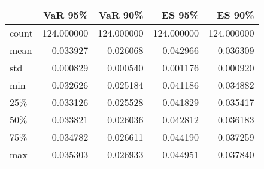 \begin{tabular}{lrrrr}
\toprule
{} &     VaR 95\% &     VaR 90\% &      ES 95\% &      ES 90\% \\
\midrule
count &  124.000000 &  124.000000 &  124.000000 &  124.000000 \\
mean  &    0.033927 &    0.026068 &    0.042966 &    0.036309 \\
std   &    0.000829 &    0.000540 &    0.001176 &    0.000920 \\
min   &    0.032626 &    0.025184 &    0.041186 &    0.034882 \\
25\%   &    0.033126 &    0.025528 &    0.041829 &    0.035417 \\
50\%   &    0.033821 &    0.026036 &    0.042812 &    0.036183 \\
75\%   &    0.034782 &    0.026611 &    0.044190 &    0.037259 \\
max   &    0.035303 &    0.026933 &    0.044951 &    0.037840 \\
\bottomrule
\end{tabular}
